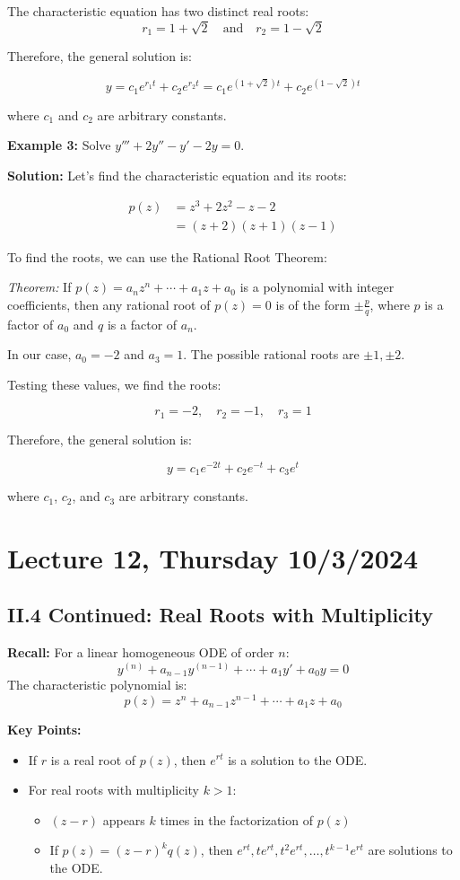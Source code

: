 \documentclass{article}
\begin{document}
The characteristic equation has two distinct real roots:
\[
r_1 = 1+\sqrt{2} \quad \text{and} \quad r_2 = 1-\sqrt{2}
\]

Therefore, the general solution is:

\[
y = c_1e^{r_1t} + c_2e^{r_2t} = c_1e^{(1+\sqrt{2})t} + c_2e^{(1-\sqrt{2})t}
\]

where $c_1$ and $c_2$ are arbitrary constants.

\textbf{Example 3:} Solve $y''' + 2y'' - y' - 2y = 0$.

\textbf{Solution:}
Let's find the characteristic equation and its roots:

\begin{align*}
p(z) &= z^3 + 2z^2 - z - 2 \\
     &= (z+2)(z+1)(z-1)
\end{align*}

To find the roots, we can use the Rational Root Theorem:

\textit{Theorem:} If $p(z) = a_nz^n + \cdots + a_1z + a_0$ is a polynomial with integer coefficients, then any rational root of $p(z) = 0$ is of the form $\pm \frac{p}{q}$, where $p$ is a factor of $a_0$ and $q$ is a factor of $a_n$.

In our case, $a_0 = -2$ and $a_3 = 1$. The possible rational roots are $\pm 1, \pm 2$.

Testing these values, we find the roots:

\[
r_1 = -2, \quad r_2 = -1, \quad r_3 = 1
\]

Therefore, the general solution is:

\[
y = c_1e^{-2t} + c_2e^{-t} + c_3e^t
\]

where $c_1$, $c_2$, and $c_3$ are arbitrary constants.

\section*{Lecture 12, Thursday 10/3/2024}

\subsection*{II.4 Continued: Real Roots with Multiplicity}

\textbf{Recall:} For a linear homogeneous ODE of order $n$:
\[
y^{(n)} + a_{n-1}y^{(n-1)} + \cdots + a_1y' + a_0y = 0
\]
The characteristic polynomial is:
\[
p(z) = z^n + a_{n-1}z^{n-1} + \cdots + a_1z + a_0
\]

\textbf{Key Points:}
\begin{itemize}
    \item If $r$ is a real root of $p(z)$, then $e^{rt}$ is a solution to the ODE.
    \item For real roots with multiplicity $k > 1$:
    \begin{itemize}
        \item $(z-r)$ appears $k$ times in the factorization of $p(z)$
        \item If $p(z) = (z-r)^k q(z)$, then $e^{rt}, te^{rt}, t^2e^{rt}, \ldots, t^{k-1}e^{rt}$ are solutions to the ODE.
    \end{itemize}
\end{itemize}
\end{document}
